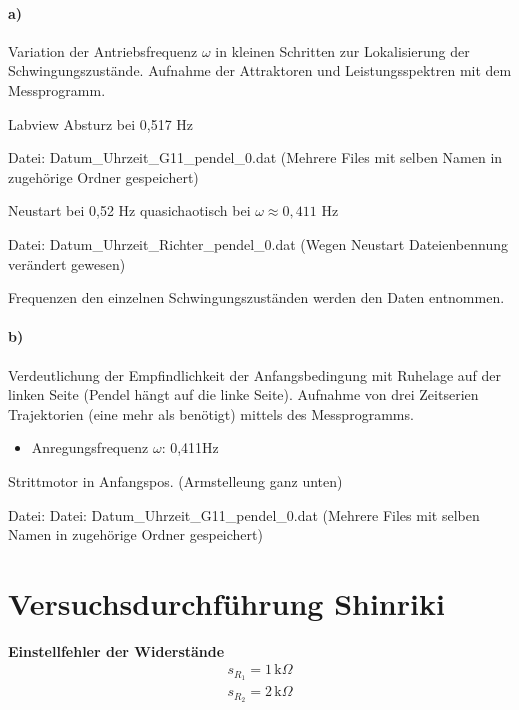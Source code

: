 \paragraph{a)}
Variation der Antriebsfrequenz $\omega$ in kleinen Schritten zur Lokalisierung der Schwingungszustände. Aufnahme der Attraktoren und Leistungsspektren mit dem Messprogramm.

Labview Absturz bei 0,517 Hz 

Datei: Datum\_Uhrzeit\_G11\_pendel\_0.dat (Mehrere Files mit selben Namen in zugehörige Ordner gespeichert)

Neustart bei 0,52 Hz
quasichaotisch bei $\omega\approx0,411$ Hz

Datei: Datum\_Uhrzeit\_Richter\_pendel\_0.dat (Wegen Neustart Dateienbennung verändert gewesen)

Frequenzen den einzelnen Schwingungszuständen werden den Daten entnommen.

\paragraph{b)}
Verdeutlichung der Empfindlichkeit der Anfangsbedingung mit Ruhelage auf der linken Seite (Pendel hängt auf die linke Seite). Aufnahme von drei Zeitserien Trajektorien (eine mehr als benötigt) mittels des Messprogramms.
\begin{itemize}
    \item Anregungsfrequenz $\omega$: 0,411Hz
\end{itemize}
Strittmotor in Anfangspos. (Armstelleung ganz unten)

Datei: Datei: Datum\_Uhrzeit\_G11\_pendel\_0.dat (Mehrere Files mit selben Namen in zugehörige Ordner gespeichert)

\section{Versuchsdurchführung Shinriki}
\label{sec:versuchShin}

\textbf{Einstellfehler der Widerstände}
\begin{align}
    s_{R_1} = 1\, \text{k}\Omega \\
    s_{R_2} = 2\, \text{k}\Omega
\end{align}

